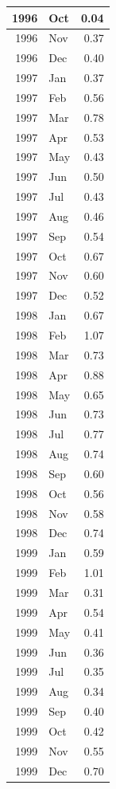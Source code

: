 \documentclass[
]{article}
\begin{document}
\begin{table}[H]
\begin{tabular}[t]{r|l|r}
\hline
1996 & Oct & 0.04\\
\hline
1996 & Nov & 0.37\\
\hline
1996 & Dec & 0.40\\
\hline
1997 & Jan & 0.37\\
\hline
1997 & Feb & 0.56\\
\hline
1997 & Mar & 0.78\\
\hline
1997 & Apr & 0.53\\
\hline
1997 & May & 0.43\\
\hline
1997 & Jun & 0.50\\
\hline
1997 & Jul & 0.43\\
\hline
1997 & Aug & 0.46\\
\hline
1997 & Sep & 0.54\\
\hline
1997 & Oct & 0.67\\
\hline
1997 & Nov & 0.60\\
\hline
1997 & Dec & 0.52\\
\hline
1998 & Jan & 0.67\\
\hline
1998 & Feb & 1.07\\
\hline
1998 & Mar & 0.73\\
\hline
1998 & Apr & 0.88\\
\hline
1998 & May & 0.65\\
\hline
1998 & Jun & 0.73\\
\hline
1998 & Jul & 0.77\\
\hline
1998 & Aug & 0.74\\
\hline
1998 & Sep & 0.60\\
\hline
1998 & Oct & 0.56\\
\hline
1998 & Nov & 0.58\\
\hline
1998 & Dec & 0.74\\
\hline
1999 & Jan & 0.59\\
\hline
1999 & Feb & 1.01\\
\hline
1999 & Mar & 0.31\\
\hline
1999 & Apr & 0.54\\
\hline
1999 & May & 0.41\\
\hline
1999 & Jun & 0.36\\
\hline
1999 & Jul & 0.35\\
\hline
1999 & Aug & 0.34\\
\hline
1999 & Sep & 0.40\\
\hline
1999 & Oct & 0.42\\
\hline
1999 & Nov & 0.55\\
\hline
1999 & Dec & 0.70\\

\end{tabular}
\end{table}
\end{document}
